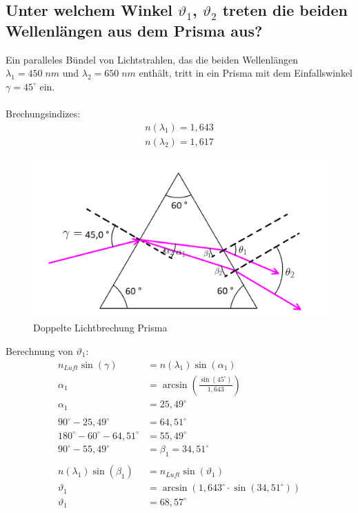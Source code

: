 \documentclass[a4paper]{scrartcl}
\numberwithin{equation}{subsection}
\begin{document}
\subsection{Unter welchem Winkel $\vartheta_1$, $\vartheta_2$ treten die beiden Wellenlängen aus dem Prisma aus?}
Ein paralleles Bündel von Lichtstrahlen, das die beiden Wellenlängen $\lambda_1 = 450\; nm$ und $\lambda_2 = 650\; nm$ enthält, tritt in ein Prisma mit dem Einfallswinkel $\gamma = 45^\circ$ ein.\\
\quad\\
Brechungsindizes:
\begin{align*}
n(\lambda_1) = 1,643 \\
n(\lambda_2) = 1,617
\end{align*}

\begin{figure}[H]
	\includegraphics[width=12cm]{Abbildungen/Prisma}
	\centering
	\caption{Doppelte Lichtbrechung Prisma}
	\centering
	\label{fig:AufgabePrisma}
\end{figure}

Berechnung von $\vartheta_1$:
\begin{align*}
	n_{Luft}\sin(\gamma) &= n(\lambda_1)\sin(\alpha_1) \\
	\alpha_1 &= \arcsin\left(\frac{\sin(45^\circ)}{1,643}\right) \\
	\alpha_1 &= 25,49^\circ \\
	\quad \\
	90^\circ - 25,49^\circ &= 64,51^\circ \\
	180^\circ - 60^\circ - 64,51^\circ &= 55,49^\circ \\
	90^\circ - 55,49^\circ &= \beta_1 = 34,51^\circ \\
	\quad \\
	n(\lambda_1)\sin(\beta_1) &= n_{Luft}\sin(\vartheta_1) \\
	\vartheta_1 &= \arcsin(1,643^\circ \cdot \sin(34,51^\circ)) \\
	\vartheta_1 &= 68,57^\circ
\end{align*}
\end{document}
